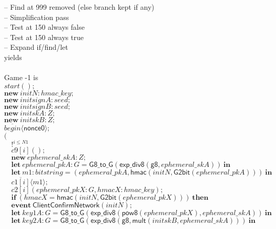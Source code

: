 \documentclass{article}
\newcommand{\cinput}[2]{{#1}({#2})}
\newcommand{\coutput}[2]{\overline{#1}\langle{#2}\rangle}
\newcommand{\kw}[1]{\mathbf{#1}}
\newcommand{\kwf}[1]{\mathsf{#1}}
\newcommand{\var}[1]{\mathit{#1}}
\newcommand{\kwt}[1]{\mathit{#1}}
\newcommand{\kwp}[1]{\mathit{#1}}
\newcommand{\kwc}[1]{\mathit{#1}}
\begin{document}
\begin{tabbing}
\qquad -- Find at 999 removed (else branch kept if any)\\
\quad -- Simplification pass\\
\qquad -- Test at 150 always false\\
\qquad -- Test at 150 always true\\
\quad -- Expand if/find/let\\
yields\\
\\
Game -1 is\\
\>$\cinput{\kwc{start}}{};$\\
\>$\kw{new}\ \var{initN}: \kwt{hmac{\_}key};$\\
\>$\kw{new}\ \var{initsignA}: \kwt{seed};$\\
\>$\kw{new}\ \var{initsignB}: \kwt{seed};$\\
\>$\kw{new}\ \var{initskA}: \kwt{Z};$\\
\>$\kw{new}\ \var{initskB}: \kwt{Z};$\\
\>$\coutput{\kwc{begin}}{\kwf{nonce0}};$\\
\>$($\\
\>$\quad !^{\var{i} \leq \kwp{N1}}$\\
\>$\quad \cinput{\kwc{c9}[\var{i}]}{};$\\
\>$\quad \kw{new}\ \var{ephemeral{\_}skA}: \kwt{Z};$\\
\>$\quad \kw{let}\ \var{ephemeral{\_}pkA}: \kwt{G} = \kwf{G8{\_}to{\_}G}(\kwf{exp{\_}div8}(\kwf{g8}, \var{ephemeral{\_}skA}))\ \kw{in}$\\
\>$\quad \kw{let}\ \var{m1}: \kwt{bitstring} = \kwf{}(\var{ephemeral{\_}pkA}, \kwf{hmac}(\var{initN}, \kwf{G2bit}(\var{ephemeral{\_}pkA})))\ \kw{in}$\\
\>$\quad \coutput{\kwc{c1}[\var{i}]}{\var{m1}};$\\
\>$\quad \cinput{\kwc{c2}[\var{i}]}{\var{ephemeral{\_}pkX}: \kwt{G}, \var{hmacX}: \kwt{hmac{\_}key}};$\\
\>$\quad \kw{if}\ (\var{hmacX}  =  \kwf{hmac}(\var{initN}, \kwf{G2bit}(\var{ephemeral{\_}pkX})))\ \kw{then}$\\
\>$\quad \kw{event}\ \kwf{ClientConfirmNetwork}(\var{initN});$\\
\>$\quad \kw{let}\ \var{key1A}: \kwt{G} = \kwf{G8{\_}to{\_}G}(\kwf{exp{\_}div8}(\kwf{pow8}(\var{ephemeral{\_}pkX}), \var{ephemeral{\_}skA}))\ \kw{in}$\\
\>$\quad \kw{let}\ \var{key2A}: \kwt{G} = \kwf{G8{\_}to{\_}G}(\kwf{exp{\_}div8}(\kwf{g8}, \kwf{mult}(\var{initskB}, \var{ephemeral{\_}skA})))\ \kw{in}$\\

\end{tabbing}
\end{document}
